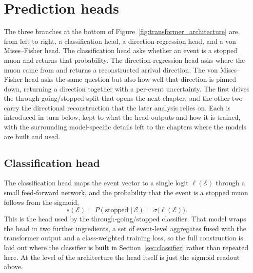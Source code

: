 %

\section{Prediction heads}
\label{sec:prediction_heads}

The three branches at the bottom of Figure~\ref{fig:transformer_architecture} are, from left to right, a classification head, a direction-regression head, and a von Mises--Fisher head. The classification head asks whether an event is a stopped muon and returns that probability. The direction-regression head asks where the muon came from and returns a reconstructed arrival direction. The von Mises--Fisher head asks the same question but also how well that direction is pinned down, returning a direction together with a per-event uncertainty. The first drives the through-going/stopped split that opens the next chapter, and the other two carry the directional reconstruction that the later analysis relies on. Each is introduced in turn below, kept to what the head outputs and how it is trained, with the surrounding model-specific details left to the chapters where the models are built and used.

\subsection{Classification head}

The classification head maps the event vector to a single logit $\ell(\mathcal{E})$ through a small feed-forward network, and the probability that the event is a stopped muon follows from the sigmoid,
\[
    s(\mathcal{E}) = P(\mathrm{stopped}\mid\mathcal{E}) = \sigma\bigl(\ell(\mathcal{E})\bigr).
\]
This is the head used by the through-going/stopped classifier. That model wraps the head in two further ingredients, a set of event-level aggregates fused with the transformer output and a class-weighted training loss, so the full construction is laid out where the classifier is built in Section~\ref{sec:classifier} rather than repeated here. At the level of the architecture the head itself is just the sigmoid readout above.

